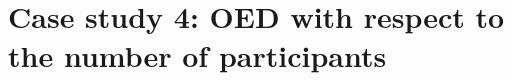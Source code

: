 \documentclass[11pt]{article}
\begin{document}

\section{Case study 4: OED with respect to the number of participants}
\end{document}
